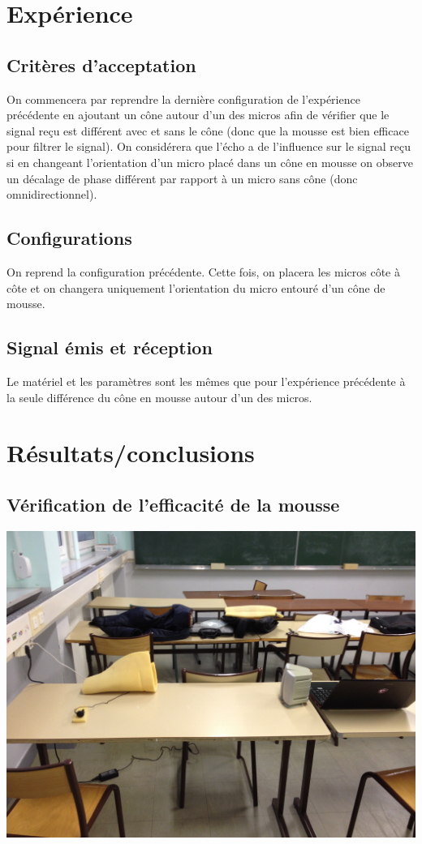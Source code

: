 \documentclass[12pt,a4paper]{report}
\begin{document}
\section{Expérience}
\subsection{Critères d'acceptation}
On commencera par reprendre la dernière configuration de l'expérience précédente en ajoutant un cône autour d'un des micros afin de vérifier que le signal reçu est différent avec et sans le cône (donc que la mousse est bien efficace pour filtrer le signal).
On considérera que l'écho a de l'influence sur le signal reçu si en changeant l'orientation d'un micro placé dans un cône en mousse on observe un décalage de phase différent par rapport à un micro sans cône (donc omnidirectionnel).

\subsection{Configurations}
On reprend la configuration précédente. Cette fois, on placera les micros côte à côte et on changera uniquement l'orientation  du micro entouré d'un cône de mousse.

\subsection{Signal émis et réception}
Le matériel et les paramètres sont les mêmes que pour l'expérience précédente à la seule différence du cône en mousse autour d'un des micros.

\section{Résultats/conclusions}


\subsection{Vérification de l'efficacité de la mousse}
\includegraphics[width=\textwidth]{../tests/test_du_protocole/cone_face.jpg} 
\end{document}
